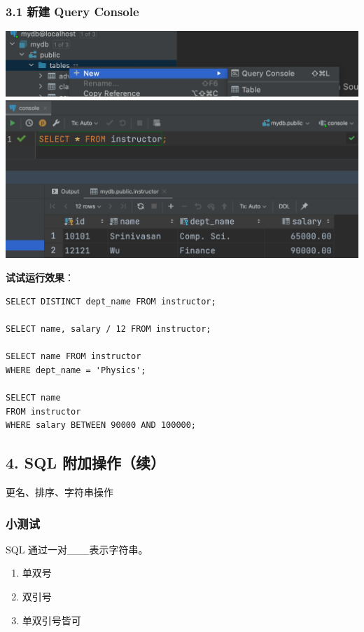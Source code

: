 \documentclass[aspectratio=169, 14pt]{beamer}
\begin{document}
\begin{frame}
	\frametitle{3.1 新建 Query Console}
	\includegraphics[height=.34\paperheight]{week4/console}
	\pause
	\includegraphics[height=.5\paperheight]{week4/select}

\end{frame}

\begin{frame}[fragile]
	\textbf{试试运行效果}：

	\begin{verbatim} 
SELECT DISTINCT dept_name FROM instructor;       

SELECT name, salary / 12 FROM instructor;

SELECT name FROM instructor
WHERE dept_name = 'Physics';

SELECT name
FROM instructor
WHERE salary BETWEEN 90000 AND 100000;
\end{verbatim}

\end{frame}

\begin{frame}
	\section{\textcolor{darkmidnightblue}{4. SQL 附加操作（续）}}
	更名、排序、\alert{字符串操作}
\end{frame}

\begin{frame}
	\frametitle{小测试}
	{
		\renewcommand{\theenumi}{\Alph{enumi}}
		SQL 通过一对\_\_\_表示字符串。
		\begin{enumerate}
			\item 单双号
			\item 双引号
			\item 单双引号皆可
		\end{enumerate}
	}

\end{frame}
\end{document}
